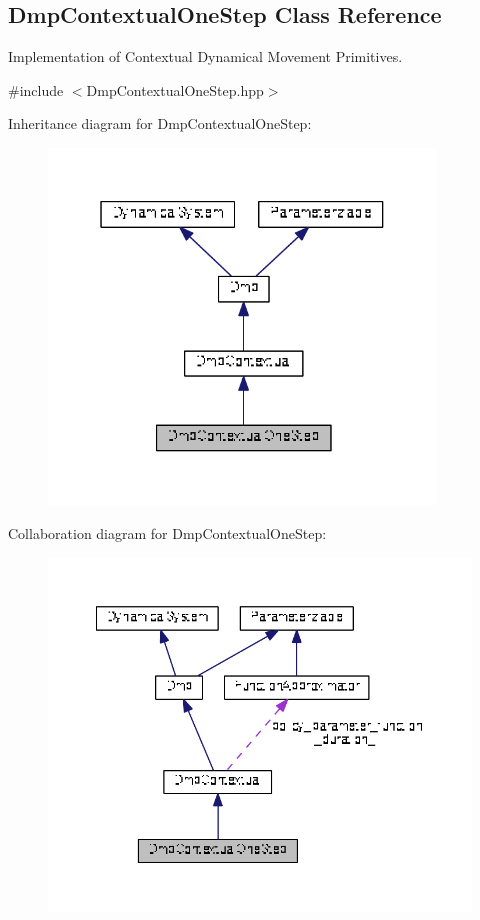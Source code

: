 \hypertarget{classDmpBbo_1_1DmpContextualOneStep}{\subsection{Dmp\+Contextual\+One\+Step Class Reference}
\label{classDmpBbo_1_1DmpContextualOneStep}
}


Implementation of Contextual Dynamical Movement Primitives.  




{\ttfamily \#include $<$Dmp\+Contextual\+One\+Step.\+hpp$>$}



Inheritance diagram for Dmp\+Contextual\+One\+Step\+:
\nopagebreak
\begin{figure}[H]
\begin{center}
\leavevmode
\includegraphics[width=292pt]{classDmpBbo_1_1DmpContextualOneStep__inherit__graph}
\end{center}
\end{figure}


Collaboration diagram for Dmp\+Contextual\+One\+Step\+:
\nopagebreak
\begin{figure}[H]
\begin{center}
\leavevmode
\includegraphics[width=349pt]{classDmpBbo_1_1DmpContextualOneStep__coll__graph}
\end{center}
\end{figure}
